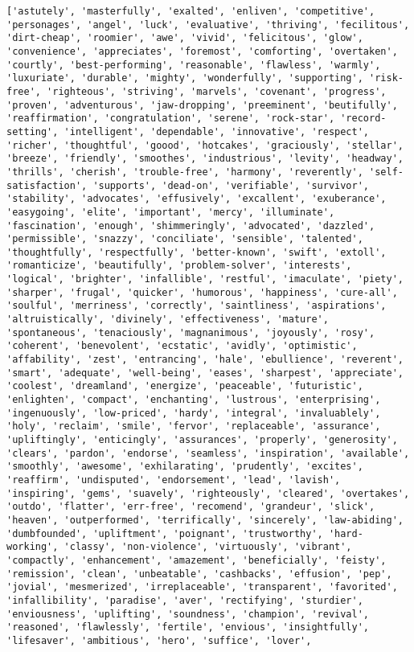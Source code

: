 \documentclass[11pt]{article}
\begin{document}
    \begin{Verbatim}[commandchars=\\\{\}]
['astutely', 'masterfully', 'exalted', 'enliven', 'competitive', 'personages', 'angel', 'luck', 'evaluative', 'thriving', 'fecilitous', 'dirt-cheap', 'roomier', 'awe', 'vivid', 'felicitous', 'glow', 'convenience', 'appreciates', 'foremost', 'comforting', 'overtaken', 'courtly', 'best-performing', 'reasonable', 'flawless', 'warmly', 'luxuriate', 'durable', 'mighty', 'wonderfully', 'supporting', 'risk-free', 'righteous', 'striving', 'marvels', 'covenant', 'progress', 'proven', 'adventurous', 'jaw-dropping', 'preeminent', 'beutifully', 'reaffirmation', 'congratulation', 'serene', 'rock-star', 'record-setting', 'intelligent', 'dependable', 'innovative', 'respect', 'richer', 'thoughtful', 'goood', 'hotcakes', 'graciously', 'stellar', 'breeze', 'friendly', 'smoothes', 'industrious', 'levity', 'headway', 'thrills', 'cherish', 'trouble-free', 'harmony', 'reverently', 'self-satisfaction', 'supports', 'dead-on', 'verifiable', 'survivor', 'stability', 'advocates', 'effusively', 'excallent', 'exuberance', 'easygoing', 'elite', 'important', 'mercy', 'illuminate', 'fascination', 'enough', 'shimmeringly', 'advocated', 'dazzled', 'permissible', 'snazzy', 'conciliate', 'sensible', 'talented', 'thoughtfully', 'respectfully', 'better-known', 'swift', 'extoll', 'romanticize', 'beautifully', 'problem-solver', 'interests', 'logical', 'brighter', 'infallible', 'restful', 'imaculate', 'piety', 'sharper', 'frugal', 'quicker', 'humorous', 'happiness', 'cure-all', 'soulful', 'merriness', 'correctly', 'saintliness', 'aspirations', 'altruistically', 'divinely', 'effectiveness', 'mature', 'spontaneous', 'tenaciously', 'magnanimous', 'joyously', 'rosy', 'coherent', 'benevolent', 'ecstatic', 'avidly', 'optimistic', 'affability', 'zest', 'entrancing', 'hale', 'ebullience', 'reverent', 'smart', 'adequate', 'well-being', 'eases', 'sharpest', 'appreciate', 'coolest', 'dreamland', 'energize', 'peaceable', 'futuristic', 'enlighten', 'compact', 'enchanting', 'lustrous', 'enterprising', 'ingenuously', 'low-priced', 'hardy', 'integral', 'invaluablely', 'holy', 'reclaim', 'smile', 'fervor', 'replaceable', 'assurance', 'upliftingly', 'enticingly', 'assurances', 'properly', 'generosity', 'clears', 'pardon', 'endorse', 'seamless', 'inspiration', 'available', 'smoothly', 'awesome', 'exhilarating', 'prudently', 'excites', 'reaffirm', 'undisputed', 'endorsement', 'lead', 'lavish', 'inspiring', 'gems', 'suavely', 'righteously', 'cleared', 'overtakes', 'outdo', 'flatter', 'err-free', 'recomend', 'grandeur', 'slick', 'heaven', 'outperformed', 'terrifically', 'sincerely', 'law-abiding', 'dumbfounded', 'upliftment', 'poignant', 'trustworthy', 'hard-working', 'classy', 'non-violence', 'virtuously', 'vibrant', 'compactly', 'enhancement', 'amazement', 'beneficially', 'feisty', 'remission', 'clean', 'unbeatable', 'cashbacks', 'effusion', 'pep', 'jovial', 'mesmerized', 'irreplaceable', 'transparent', 'favorited', 'infallibility', 'paradise', 'aver', 'rectifying', 'sturdier', 'enviousness', 'uplifting', 'soundness', 'champion', 'revival', 'reasoned', 'flawlessly', 'fertile', 'envious', 'insightfully', 'lifesaver', 'ambitious', 'hero', 'suffice', 'lover', 
\end{Verbatim}
\end{document}
